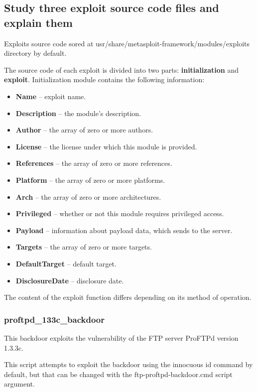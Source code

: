 \documentclass[14pt,a4paper,report]{report}
\begin{document}
\subsection{Study three exploit source code files and explain them}

Exploits source code sored at usr/share/metasploit-framework/modules/exploits directory by default. 

The source code of each exploit is divided into two parts: \textbf{initialization} and \textbf{exploit}. Initialization module contains the following information:

\begin{itemize}
	\item \textbf{Name} -- exploit name.
	\item \textbf{Description} -- the module's description.
	\item \textbf{Author} -- the array of zero or more authors.
	\item \textbf{License} -- the license under which this module is provided.
	\item \textbf{References} --  the array of zero or more references.
	\item \textbf{Platform} -- the array of zero or more platforms.
	\item \textbf{Arch} -- the array of zero or more architectures.
	\item \textbf{Privileged} -- whether or not this module requires privileged access.
	\item \textbf{Payload} -- information about payload data, which sends to the server.
	\item \textbf{Targets} -- the array of zero or more targets.
	\item \textbf{DefaultTarget} -- default target.
	\item \textbf{DisclosureDate} -- disclosure date.
\end{itemize}

The content of the exploit function differs depending on its method of operation.

\subsubsection{proftpd\_133c\_backdoor}

This backdoor exploits the vulnerability of the FTP server ProFTPd version 1.3.3c.

This script attempts to exploit the backdoor using the innocuous id command by default, but that can be changed with the ftp-proftpd-backdoor.cmd script argument.
\end{document}
